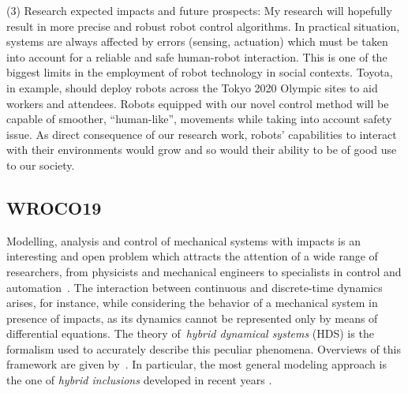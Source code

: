 (3) Research expected impacts and future prospects: My research will hopefully result in more precise and robust robot control algorithms. In practical situation, systems are always affected by errors (sensing, actuation) which must be taken into account for a reliable and safe human-robot interaction. This is one of the biggest limits in the employment of robot technology in social contexts. Toyota, in example, should deploy robots across the Tokyo 2020 Olympic sites to aid workers and attendees. Robots equipped with our novel control method will be capable of smoother, “human-like”, movements while taking into account safety issue. As direct consequence of our research work, robots’ capabilities to interact with their environments would grow and so would their ability to be of good use to our society.

{\color{red}
\subsection{WROCO19}
Modelling, analysis and control of mechanical systems with impacts is an interesting and open problem which attracts the attention of a wide range of researchers, from physicists and mechanical engineers to specialists in control and automation~\cite{brogliato1999nonsmooth,stronge2018impact}.
The interaction between continuous and discrete-time dynamics arises, for instance, while considering the behavior of a mechanical system in presence of impacts, as its dynamics cannot be represented only by means of differential equations. The theory of~\textit{hybrid dynamical systems} (HDS) is the formalism used to accurately describe this peculiar phenomena. Overviews of this framework are given by~\cite{van2000introduction,haddad2006impulsive}. In particular, the most general modeling approach is the one of \textit{hybrid inclusions} developed in recent years \cite{goebel2009hybrid}.

}
